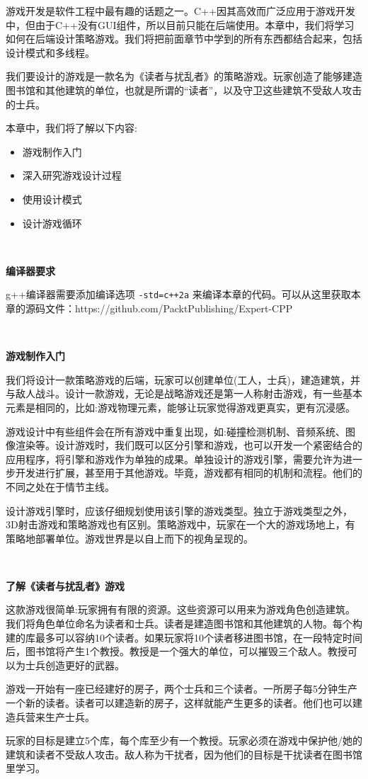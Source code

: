 游戏开发是软件工程中最有趣的话题之一。C++因其高效而广泛应用于游戏开发中，但由于C++没有GUI组件，所以目前只能在后端使用。本章中，我们将学习如何在后端设计策略游戏。我们将把前面章节中学到的所有东西都结合起来，包括设计模式和多线程。 \par
我们要设计的游戏是一款名为《读者与扰乱者》的策略游戏。玩家创造了能够建造图书馆和其他建筑的单位，也就是所谓的“读者”，以及守卫这些建筑不受敌人攻击的士兵。 \par
本章中，我们将了解以下内容: \par

\begin{itemize}
	\item 游戏制作入门
	\item 深入研究游戏设计过程
	\item 使用设计模式
	\item 设计游戏循环
\end{itemize}

\noindent\textbf{}\ \par
\textbf{编译器要求} \ \par
g++编译器需要添加编译选项 \texttt{-std=c++2a} 来编译本章的代码。可以从这里获取本章的源码文件：https:/​/github.​com/PacktPublishing/Expert-CPP \par

\noindent\textbf{}\ \par
\textbf{游戏制作入门} \ \par
我们将设计一款策略游戏的后端，玩家可以创建单位(工人，士兵)，建造建筑，并与敌人战斗。设计一款游戏，无论是战略游戏还是第一人称射击游戏，有一些基本元素是相同的，比如:游戏物理元素，能够让玩家觉得游戏更真实，更有沉浸感。 \par
游戏设计中有些组件会在所有游戏中重复出现，如:碰撞检测机制、音频系统、图像渲染等。设计游戏时，我们既可以区分引擎和游戏，也可以开发一个紧密结合的应用程序，将引擎和游戏作为单独的成果。单独设计的游戏引擎，需要允许为进一步开发进行扩展，甚至用于其他游戏。毕竟，游戏都有相同的机制和流程。他们的不同之处在于情节主线。 \par
设计游戏引擎时，应该仔细规划使用该引擎的游戏类型。独立于游戏类型之外，3D射击游戏和策略游戏也有区别。策略游戏中，玩家在一个大的游戏场地上，有策略地部署单位。游戏世界是以自上而下的视角呈现的。 \par

\noindent\textbf{}\ \par
\textbf{了解《读者与扰乱者》游戏} \ \par
这款游戏很简单:玩家拥有有限的资源。这些资源可以用来为游戏角色创造建筑。我们将角色单位命名为读者和士兵。读者是建造图书馆和其他建筑的人物。每个构建的库最多可以容纳10个读者。如果玩家将10个读者移进图书馆，在一段特定时间后，图书馆将产生1个教授。教授是一个强大的单位，可以摧毁三个敌人。教授可以为士兵创造更好的武器。 \par
游戏一开始有一座已经建好的房子，两个士兵和三个读者。一所房子每5分钟生产一个新的读者。读者可以建造新的房子，这样就能产生更多的读者。他们也可以建造兵营来生产士兵。 \par
玩家的目标是建立5个库，每个库至少有一个教授。玩家必须在游戏中保护他/她的建筑和读者不受敌人攻击。敌人称为干扰者，因为他们的目标是干扰读者在图书馆里学习。 \par

